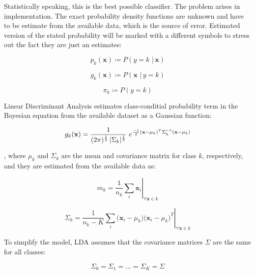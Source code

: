 \documentclass{article}
\begin{document}
Statistically speaking, this is the best possible classifier. The problem arises in implementation. The exact probability density functions are unknown and have to be estimate from the available data, which is the source of error.
Estimated version of the stated probability will be marked with a different symbols to stress out the fact they are just an estimates:

\begin{equation} 
p_k(\mathbf{x}) \coloneqq P(y=k \,\, | \, \mathbf{x})
\end{equation}

\begin{equation} 
g_k(\mathbf{x}) \coloneqq P(\mathbf{x}  \,\, | \, y=k)
\end{equation}

\begin{equation} 
\pi_k \coloneqq P(y=k)
\end{equation}


Linear Discriminant Analysis estimates class-conditial probability term in the Bayesian equation from the available dataset as a Gaussian function:

\begin{equation} 
g_k(\mathbf{x}) = \frac{1}{(2 \pi)^{\nicefrac{1}{2}}\, |\Sigma_k|^{\nicefrac{1}{2}}}\,\, e^{\nicefrac{-1}{2}  (\mathbf{x}-\mu_k)^T  \Sigma_k^{-1} (\mathbf{x}-\mu_k)} 
\end{equation}

, where $\mu_k$ and $\Sigma_k$ are the mean and covariance matrix for class $k$, respectively, and they are estimated from the available data as:

\begin{equation}
\left. m_k = \frac{1}{n_k} \sum_{i}{\mathbf{x}_i} \right\vert_{\forall \mathbf{x} \in k}
\end{equation}

\begin{equation}
\left. \Sigma_k = \frac{1}{n_k-K} \sum_{i}{\Big( \mathbf{x}_i - \mu_k \Big) \Big( \mathbf{x}_i - \mu_k \Big)^T} \right\vert_{\forall \mathbf{x} \in k}
\end{equation}


 
To simplify the model, LDA assumes that the covariance matrices $\Sigma$ are the same for all classes:

\begin{equation} 
\Sigma_0 = \Sigma_1 = \dots = \Sigma_K = \Sigma
\end{equation}
\end{document}
